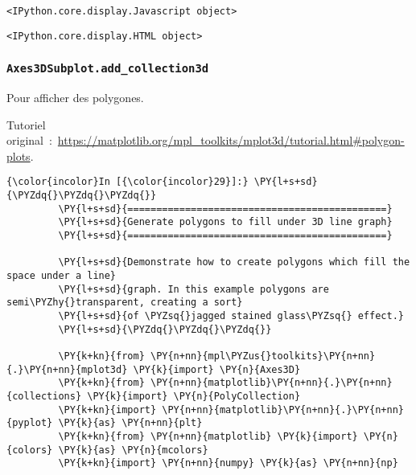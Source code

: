     
    \begin{verbatim}
<IPython.core.display.Javascript object>
    \end{verbatim}

    
    
    \begin{verbatim}
<IPython.core.display.HTML object>
    \end{verbatim}

    
    \hypertarget{axes3dsubplot.add_collection3d}{%
\subsubsection{\texorpdfstring{\texttt{Axes3DSubplot.add\_collection3d}}{Axes3DSubplot.add\_collection3d}}\label{axes3dsubplot.add_collection3d}}

    Pour afficher des polygones.

    Tutoriel
original~:~\url{https://matplotlib.org/mpl_toolkits/mplot3d/tutorial.html\#polygon-plots}.

    \begin{Verbatim}[commandchars=\\\{\},frame=single,framerule=0.3mm,rulecolor=\color{cellframecolor}]
{\color{incolor}In [{\color{incolor}29}]:} \PY{l+s+sd}{\PYZdq{}\PYZdq{}\PYZdq{}}
         \PY{l+s+sd}{=============================================}
         \PY{l+s+sd}{Generate polygons to fill under 3D line graph}
         \PY{l+s+sd}{=============================================}
         
         \PY{l+s+sd}{Demonstrate how to create polygons which fill the space under a line}
         \PY{l+s+sd}{graph. In this example polygons are semi\PYZhy{}transparent, creating a sort}
         \PY{l+s+sd}{of \PYZsq{}jagged stained glass\PYZsq{} effect.}
         \PY{l+s+sd}{\PYZdq{}\PYZdq{}\PYZdq{}}
         
         \PY{k+kn}{from} \PY{n+nn}{mpl\PYZus{}toolkits}\PY{n+nn}{.}\PY{n+nn}{mplot3d} \PY{k}{import} \PY{n}{Axes3D}
         \PY{k+kn}{from} \PY{n+nn}{matplotlib}\PY{n+nn}{.}\PY{n+nn}{collections} \PY{k}{import} \PY{n}{PolyCollection}
         \PY{k+kn}{import} \PY{n+nn}{matplotlib}\PY{n+nn}{.}\PY{n+nn}{pyplot} \PY{k}{as} \PY{n+nn}{plt}
         \PY{k+kn}{from} \PY{n+nn}{matplotlib} \PY{k}{import} \PY{n}{colors} \PY{k}{as} \PY{n}{mcolors}
         \PY{k+kn}{import} \PY{n+nn}{numpy} \PY{k}{as} \PY{n+nn}{np}
\end{Verbatim}


